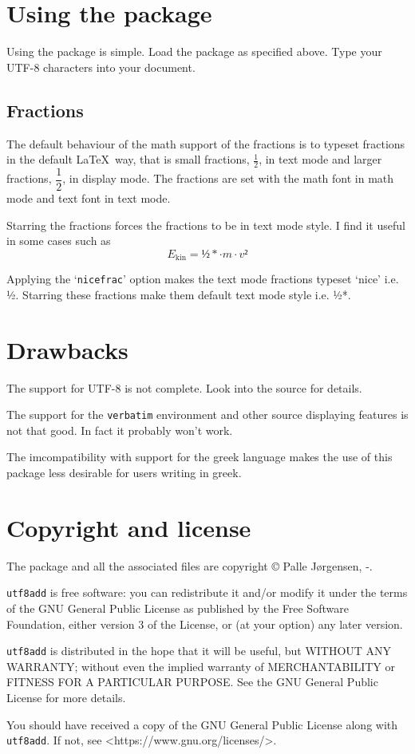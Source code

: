 \documentclass[a4paper,british,parskip=half,11pt,fleqn]{scrartcl}
\begin{document}
\clearpage
\section{Using the package}
\label{sec:using-package}

Using the package is simple. Load the package as specified above. Type
your UTF-8 characters into your document.

\subsection{Fractions}
\label{sec:fractions}

The default behaviour of the math support of the fractions is to
typeset fractions in the default \LaTeX\ way, that is small fractions,
$\tfrac12$, in text mode and larger fractions, $\dfrac12$, in display
mode. The fractions are set with the math font in math mode and text
font in text mode.

Starring the fractions forces the fractions to be in text mode style. I
find it useful in some cases such as
\begin{equation}
  E_{\text{kin}} = ½*·m·v²
\end{equation}

Applying the `\texttt{nicefrac}' option makes the text mode fractions
typeset `nice' i.e. ½. Starring these fractions make them default
text mode style i.e. ½*.

\section{Drawbacks}
\label{sec:drawbacks}

The support for UTF-8 is not complete. Look into the source for
details.

The support for the \texttt{verbatim} environment and other source
displaying features is not that good. In fact it probably won't work.

The imcompatibility with support for the greek language makes the use
of this package less desirable for users writing in greek.

\section{Copyright and license}
\label{sec:copyright-license}

The \texttt{\jobname} package and all the associated files are
copyright © Palle Jørgensen, \ifnum{}-\the\year\fi.

\texttt{utf8add} is free software: you can redistribute it and/or
modify it under the terms of the GNU General Public License as
published by the Free Software Foundation, either version 3 of the
License, or (at your option) any later version.

\texttt{utf8add} is distributed in the hope that it will be useful,
but WITHOUT ANY WARRANTY; without even the implied warranty of
MERCHANTABILITY or FITNESS FOR A PARTICULAR PURPOSE. See the GNU
General Public License for more details.

You should have received a copy of the GNU General Public License
along with \texttt{utf8add}. If not, see
<https://www.gnu.org/licenses/>.
\end{document}
